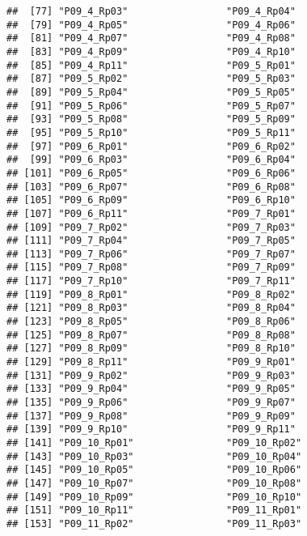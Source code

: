 \documentclass[
]{article}
\begin{document}
\begin{verbatim}
##  [77] "P09_4_Rp03"                 "P09_4_Rp04"                
##  [79] "P09_4_Rp05"                 "P09_4_Rp06"                
##  [81] "P09_4_Rp07"                 "P09_4_Rp08"                
##  [83] "P09_4_Rp09"                 "P09_4_Rp10"                
##  [85] "P09_4_Rp11"                 "P09_5_Rp01"                
##  [87] "P09_5_Rp02"                 "P09_5_Rp03"                
##  [89] "P09_5_Rp04"                 "P09_5_Rp05"                
##  [91] "P09_5_Rp06"                 "P09_5_Rp07"                
##  [93] "P09_5_Rp08"                 "P09_5_Rp09"                
##  [95] "P09_5_Rp10"                 "P09_5_Rp11"                
##  [97] "P09_6_Rp01"                 "P09_6_Rp02"                
##  [99] "P09_6_Rp03"                 "P09_6_Rp04"                
## [101] "P09_6_Rp05"                 "P09_6_Rp06"                
## [103] "P09_6_Rp07"                 "P09_6_Rp08"                
## [105] "P09_6_Rp09"                 "P09_6_Rp10"                
## [107] "P09_6_Rp11"                 "P09_7_Rp01"                
## [109] "P09_7_Rp02"                 "P09_7_Rp03"                
## [111] "P09_7_Rp04"                 "P09_7_Rp05"                
## [113] "P09_7_Rp06"                 "P09_7_Rp07"                
## [115] "P09_7_Rp08"                 "P09_7_Rp09"                
## [117] "P09_7_Rp10"                 "P09_7_Rp11"                
## [119] "P09_8_Rp01"                 "P09_8_Rp02"                
## [121] "P09_8_Rp03"                 "P09_8_Rp04"                
## [123] "P09_8_Rp05"                 "P09_8_Rp06"                
## [125] "P09_8_Rp07"                 "P09_8_Rp08"                
## [127] "P09_8_Rp09"                 "P09_8_Rp10"                
## [129] "P09_8_Rp11"                 "P09_9_Rp01"                
## [131] "P09_9_Rp02"                 "P09_9_Rp03"                
## [133] "P09_9_Rp04"                 "P09_9_Rp05"                
## [135] "P09_9_Rp06"                 "P09_9_Rp07"                
## [137] "P09_9_Rp08"                 "P09_9_Rp09"                
## [139] "P09_9_Rp10"                 "P09_9_Rp11"                
## [141] "P09_10_Rp01"                "P09_10_Rp02"               
## [143] "P09_10_Rp03"                "P09_10_Rp04"               
## [145] "P09_10_Rp05"                "P09_10_Rp06"               
## [147] "P09_10_Rp07"                "P09_10_Rp08"               
## [149] "P09_10_Rp09"                "P09_10_Rp10"               
## [151] "P09_10_Rp11"                "P09_11_Rp01"               
## [153] "P09_11_Rp02"                "P09_11_Rp03"               

\end{verbatim}
\end{document}
